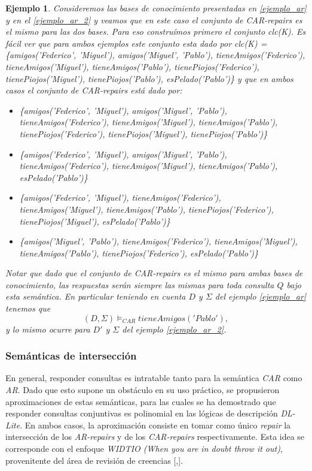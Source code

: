 \documentclass[11pt,a4paper,twoside]{tesis}
\newtheorem{exmp}{Ejemplo}
\begin{document}
\begin{exmp}\label{ejemplo_car_repairs}
Consideremos las bases de conocimiento presentadas en \ref{ejemplo_ar} y en el \ref{ejemplo_ar_2} y veamos que en este caso el conjunto de \textit{CAR-repairs} es el mismo para las dos bases. Para eso construímos primero el conjunto \textit{clc(K)}. Es fácil ver que para ambos ejemplos este conjunto esta dado por clc(K) = \{amigos('Federico', 'Miguel'), amigos('Miguel', 'Pablo'), tieneAmigos('Federico'), tieneAmigos('Miguel'), tieneAmigos('Pablo'), tienePiojos('Federico'), tienePiojos('Miguel'), tienePiojos('Pablo'), esPelado('Pablo')\} y que en ambos casos el conjunto de \textit{CAR-repairs} está dado por:
        \begin{itemize}
            \item \{amigos('Federico', 'Miguel'), amigos('Miguel', 'Pablo'), tieneAmigos('Federico'), tieneAmigos('Miguel'), tieneAmigos('Pablo'), tienePiojos('Federico'), tienePiojos('Miguel'), tienePiojos('Pablo')\}
            \item \{amigos('Federico', 'Miguel'), amigos('Miguel', 'Pablo'), tieneAmigos('Federico'), tieneAmigos('Miguel'), tieneAmigos('Pablo'),  esPelado('Pablo')\}
            \item \{amigos('Federico', 'Miguel'), tieneAmigos('Federico'), tieneAmigos('Miguel'), tieneAmigos('Pablo'), tienePiojos('Federico'), tienePiojos('Miguel'),  esPelado('Pablo')\}
           \item \{amigos('Miguel', 'Pablo'), tieneAmigos('Federico'), tieneAmigos('Miguel'), tieneAmigos('Pablo'), tienePiojos('Federico'), esPelado('Pablo')\}
        \end{itemize}
Notar que dado que el conjunto de \textit{CAR-repairs} es el mismo para ambas bases de conocimiento, las respuestas serán siempre las mismas para toda consulta $Q$ bajo esta semántica. En particular teniendo en cuenta $D$ y $\Sigma$ del ejemplo \ref{ejemplo_ar} tenemos que $$(D, \Sigma)\models_{CAR} tieneAmigos('Pablo'),$$ y lo mismo ocurre para $D\prime$ y $\Sigma$ del ejemplo \ref{ejemplo_ar_2}.
\end{exmp}

\subsubsection{Semánticas de intersección}
En general, responder consultas es intratable tanto para la semántica \textit{CAR} como \textit{AR}. Dado que esto supone un obstáculo en su uso práctico, se propusieron aproximaciones de estas semánticas, para las cuales se ha demostrado que responder consultas conjuntivas es polinomial en las lógicas de descripción \textit{DL-Lite}. En ambos casos, la aproximación consiste en tomar como único \textit{repair} la intersección de los \textit{AR-repairs} y de los \textit{CAR-repairs} respectivamente. Esta idea se corresponde con el enfoque \textit{WIDTIO (When you are in doubt throw it out)}, provenitente del área de revisión de creencias [\cite{Eiter},\cite{Winslett}].
\end{document}
